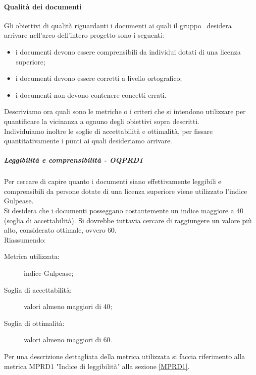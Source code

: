 \documentclass[../PianoDiQualifica.tex]{subfiles}
\begin{document}
			\paragraph{Qualità dei documenti}
			Gli obiettivi di qualità riguardanti i documenti ai quali il gruppo \leaf\ desidera arrivare nell'arco dell'intero progetto sono i seguenti:
			\begin{itemize}
				\item i documenti devono essere comprensibili da individui dotati di una licenza superiore;
				\item i documenti devono essere corretti a livello ortografico;
				\item i documenti non devono contenere concetti errati.
			\end{itemize}
			Descriviamo ora quali sono le metriche o i criteri che si intendono utilizzare per quantificare la vicinanza a ognuno degli obiettivi sopra descritti.\\
			Individuiamo inoltre le soglie di accettabilità e ottimalità, per fissare quantitativamente i punti ai quali desideriamo arrivare.
				
				\subparagraph{Leggibilità e comprensibilità - OQPRD1}
				Per cercare di capire quanto i documenti siano effettivamente leggibili e comprensibili da persone dotate di una licenza superiore viene utilizzato l’indice Gulpease\g.\\
				Si desidera che i documenti posseggano costantemente un indice maggiore a 40 (soglia di accettabilità). Si dovrebbe tuttavia cercare di raggiungere un valore più alto, considerato ottimale, ovvero 60.\\
				Riassumendo:
				\begin{description}
					\item[Metrica utilizzata:] indice Gulpease\g;
					\item[Soglia di accettabilità:] valori almeno maggiori di 40;
					\item[Soglia di ottimalità:] valori almeno maggiori di 60.
				\end{description}
				Per una descrizione dettagliata della metrica utilizzata si faccia riferimento alla metrica MPRD1 "Indice di leggibilità" alla sezione \ref{MPRD1}.
				
\end{document}

